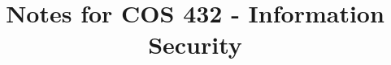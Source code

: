  \title{\vspace*{-2cm} Notes for COS 432 - Information Security\vspace*{-12mm}}
 \author{}
 \date{}
 \maketitle

 {\thispagestyle{empty}
  \vspace*{-2em}
  \tableofcontents
 }
